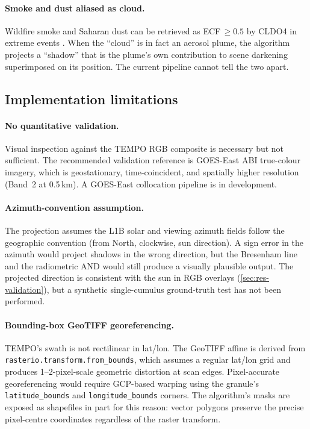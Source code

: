\documentclass[11pt,a4paper]{article}
\newcommand{\code}[1]{\texttt{#1}}
\begin{document}
\paragraph{Smoke and dust aliased as cloud.}
Wildfire smoke and Saharan dust can be retrieved as ECF\,$\geq 0.5$ by
CLDO4 in extreme events \citep[\S 3.1]{wang2025cldo4}. When the
``cloud'' is in fact an aerosol plume, the algorithm projects a
``shadow'' that is the plume's own contribution to scene darkening
superimposed on its position. The current pipeline cannot tell the two
apart.

\subsection{Implementation limitations}\label{sec:lim-impl}

\paragraph{No quantitative validation.}
Visual inspection against the TEMPO RGB composite is necessary but not
sufficient. The recommended validation reference is GOES-East ABI
true-colour imagery, which is geostationary, time-coincident, and
spatially higher resolution (Band~2 at 0.5\,km). A GOES-East
collocation pipeline is in development.

\paragraph{Azimuth-convention assumption.}
The projection assumes the L1B solar and viewing azimuth fields follow
the geographic convention (from North, clockwise, sun direction). A
sign error in the azimuth would project shadows in the wrong direction,
but the Bresenham line and the radiometric AND would still produce a
visually plausible output. The projected direction is consistent with
the sun in RGB overlays (\cref{sec:res-validation}), but a synthetic
single-cumulus ground-truth test has not been performed.

\paragraph{Bounding-box GeoTIFF georeferencing.}
TEMPO's swath is not rectilinear in lat/lon. The GeoTIFF affine is
derived from \code{rasterio.transform.from\_bounds}, which assumes a
regular lat/lon grid and produces 1--2-pixel-scale geometric distortion
at scan edges. Pixel-accurate georeferencing would require GCP-based
warping using the granule's \code{latitude\_bounds} and
\code{longitude\_bounds} corners. The algorithm's masks are exposed as
shapefiles in part for this reason: vector polygons preserve the
precise pixel-centre coordinates regardless of the raster transform.
\end{document}
